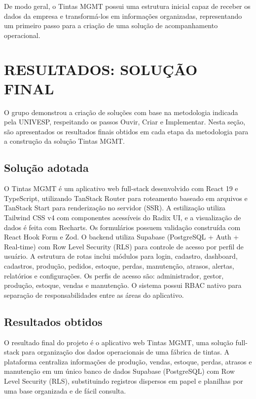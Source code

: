 \documentclass[12pt,a4paper]{article}
\begin{document}
De modo geral, o Tintas MGMT possui uma estrutura inicial capaz de receber os dados da empresa e transformá-los em informações organizadas, representando um primeiro passo para a criação de uma solução de acompanhamento operacional.

\clearpage
\section{RESULTADOS: SOLUÇÃO FINAL}

O grupo demonstrou a criação de soluções com base na metodologia indicada pela UNIVESP, respeitando os passos Ouvir, Criar e Implementar. Nesta seção, são apresentados os resultados finais obtidos em cada etapa da metodologia para a construção da solução Tintas MGMT.

\subsection{Solução adotada}
O Tintas MGMT é um aplicativo web full-stack desenvolvido com React 19 e TypeScript, utilizando TanStack Router para roteamento baseado em arquivos e TanStack Start para renderização no servidor (SSR). A estilização utiliza Tailwind CSS v4 com componentes acessíveis do Radix UI, e a visualização de dados é feita com Recharts. Os formulários possuem validação construída com React Hook Form e Zod. O backend utiliza Supabase (PostgreSQL + Auth + Real-time) com Row Level Security (RLS) para controle de acesso por perfil de usuário. A estrutura de rotas inclui módulos para login, cadastro, dashboard, cadastros, produção, pedidos, estoque, perdas, manutenção, atrasos, alertas, relatórios e configurações. Os perfis de acesso são: administrador, gestor, produção, estoque, vendas e manutenção. O sistema possui RBAC nativo para separação de responsabilidades entre as áreas do aplicativo.

\subsection{Resultados obtidos}
O resultado final do projeto é o aplicativo web Tintas MGMT, uma solução full-stack para organização dos dados operacionais de uma fábrica de tintas. A plataforma centraliza informações de produção, vendas, estoque, perdas, atrasos e manutenção em um único banco de dados Supabase (PostgreSQL) com Row Level Security (RLS), substituindo registros dispersos em papel e planilhas por uma base organizada e de fácil consulta.
\end{document}
